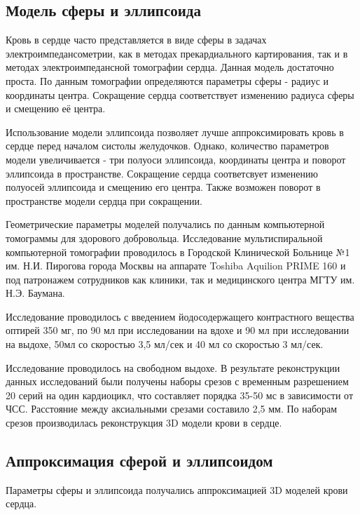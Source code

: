 \documentclass[conference]{IEEEtran}
\begin{document}
\subsection{Модель сферы и эллипсоида}


Кровь в сердце часто представляется в виде сферы в задачах электроимпедансометрии, как в методах прекардиального картирования,
так и в методах электроимпедансной томографии сердца.
Данная модель достаточно проста.
По данным томографии определяются параметры сферы - радиус и координаты центра.
Сокращение сердца соответствует изменению радиуса сферы и смещению её центра.

Использование модели эллипсоида позволяет лучше аппроксимировать кровь в сердце перед началом систолы желудочков.
Однако, количество параметров модели увеличивается - три полуоси эллипсоида, координаты центра и поворот эллипсоида в пространстве.
Сокращение сердца соответсвует изменению полуосей эллипсоида и смещению его центра.
Также возможен поворот в пространстве модели сердца при сокращении.

Геометрические параметры моделей получались по данным компьютерной томограммы для здорового добровольца.
Исследование мультиспиральной компьютерной томографии проводилось в Городской Клинической Больнице №1 им. Н.И. Пирогова города Москвы на аппарате Toshiba
Aquilion PRIME 160 и под патронажем сотрудников как клиники, так и медицинского центра МГТУ им. Н.Э. Баумана.

Исследование проводилось с введением йодосодержащего контрастного вещества оптирей 350 мг,
по 90 мл при исследовании на вдохе и 90 мл при исследовании на выдохе,
50мл со скоростью 3,5 мл/сек и 40 мл со скоростью 3 мл/сек.

Исследование проводилось на свободном выдохе.
В результате реконструкции данных исследований были получены наборы срезов
с временным разрешением 20 серий на один кардиоцикл, что составляет порядка 35-50 мс
в зависимости от ЧСС.
Расстояние между аксиальными срезами составило 2,5 мм.
По наборам срезов производилась реконструкция 3D модели крови в сердце.

\subsection{Аппроксимация сферой и эллипсоидом}
Параметры сферы и эллипсоида получались аппроксимацией 3D моделей крови сердца.
\end{document}
